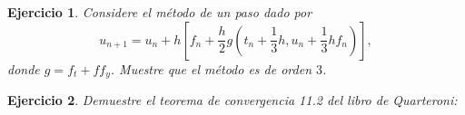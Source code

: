 \documentclass[11pt,letterpaper]{article}
\newtheorem{exercise}{Ejercicio}
\begin{document}
\begin{exercise}
  Considere el método de un paso dado por
  \begin{equation}
    u_{n+1} = u_n + h \left[
      f_n + \frac{h}{2}g \left(
        t_n + \frac{1}{3}h,
        u_n + \frac{1}{3}hf_n
      \right)
    \right]
  ,\end{equation}
  donde $g=f_t+ff_y$. Muestre que el método es de orden $3$.
\end{exercise}

\begin{exercise}
  Demuestre el teorema de convergencia 11.2 del libro de Quarteroni:
\end{exercise}
\end{document}
